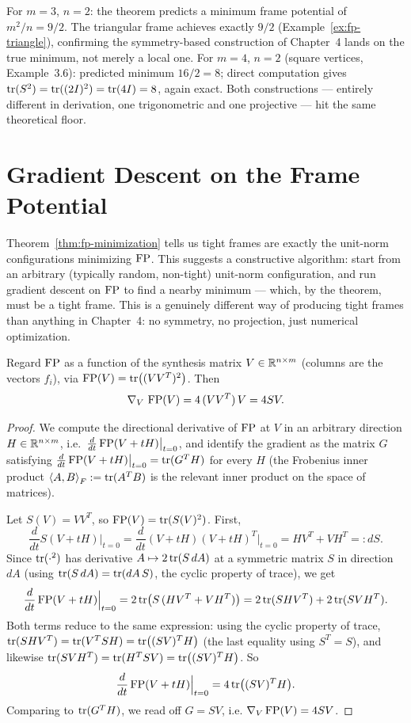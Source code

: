 \begin{examplebox}[title={Example 8.2: Verifying the minimum across constructions}]
\label{ex:fp-verify-constructions}
For $m=3$, $n=2$: the theorem predicts a minimum frame potential of
$m^2/n=9/2$. The triangular frame achieves exactly $9/2$
(Example~\ref{ex:fp-triangle}), confirming the symmetry-based
construction of Chapter~4 lands on the true minimum, not merely a local
one. For $m=4$, $n=2$ (square vertices, Example~3.6): predicted minimum
$16/2=8$; direct computation gives $\operatorname{tr}(S^2)=\operatorname{tr}((2I)^2)=\operatorname{tr}(4I)=8$,
again exact. Both constructions --- entirely different in derivation,
one trigonometric and one projective --- hit the same theoretical floor.
\end{examplebox}

\section{Gradient Descent on the Frame Potential}
\label{sec:gradient-descent}

Theorem~\ref{thm:fp-minimization} tells us tight frames are exactly the
unit-norm configurations minimizing $\operatorname{FP}$. This suggests a constructive
algorithm: start from an arbitrary (typically random, non-tight)
unit-norm configuration, and run gradient descent on $\operatorname{FP}$ to find a
nearby minimum --- which, by the theorem, must be a tight frame. This
is a genuinely different way of producing tight frames than anything in
Chapter~4: no symmetry, no projection, just numerical optimization.

\begin{proposition}
\label{prop:fp-gradient}
Regard $\operatorname{FP}$ as a function of the synthesis matrix $V\in\mathbb{R}^{n\times m}$
(columns are the vectors $f_i$), via $\operatorname{FP}(V)=\operatorname{tr}\bigl((VV^T)^2\bigr)$.
Then
\[
  \nabla_V\,\operatorname{FP}(V) = 4\,(VV^T)\,V = 4SV.
\]
\end{proposition}

\begin{proof}
We compute the directional derivative of $\operatorname{FP}$ at $V$ in an arbitrary
direction $H\in\mathbb{R}^{n\times m}$, i.e.\ $\frac{d}{dt}\operatorname{FP}(V+tH)\big|_{t=0}$,
and identify the gradient as the matrix $G$ satisfying
$\frac{d}{dt}\operatorname{FP}(V+tH)\big|_{t=0}=\operatorname{tr}(G^TH)$ for every $H$ (the
Frobenius inner product $\left\langle A, B \right\rangle_F:=\operatorname{tr}(A^TB)$ is the relevant
inner product on the space of matrices).

Let $S(V)=VV^T$, so $\operatorname{FP}(V)=\operatorname{tr}(S(V)^2)$. First,
\[
  \frac{d}{dt}S(V+tH)\Big|_{t=0}
  = \frac{d}{dt}(V+tH)(V+tH)^T\Big|_{t=0} = HV^T+VH^T =: dS.
\]
Since $\operatorname{tr}(\cdot^2)$ has derivative $A\mapsto2\operatorname{tr}(S\,dA)$ at a symmetric
matrix $S$ in direction $dA$ (using $\operatorname{tr}(S\,dA)=\operatorname{tr}(dA\,S)$, the cyclic
property of trace), we get
\[
  \frac{d}{dt}\operatorname{FP}(V+tH)\Big|_{t=0}
  = 2\operatorname{tr}\bigl(S\,(HV^T+VH^T)\bigr)
  = 2\operatorname{tr}(SHV^T) + 2\operatorname{tr}(SVH^T).
\]
Both terms reduce to the same expression: using the cyclic property of
trace, $\operatorname{tr}(SHV^T)=\operatorname{tr}(V^TSH)=\operatorname{tr}\bigl((SV)^TH\bigr)$ (the last equality
using $S^T=S$), and likewise $\operatorname{tr}(SVH^T)=\operatorname{tr}(H^TSV)=\operatorname{tr}\bigl((SV)^TH
\bigr)$. So
\[
  \frac{d}{dt}\operatorname{FP}(V+tH)\Big|_{t=0} = 4\operatorname{tr}\bigl((SV)^TH\bigr).
\]
Comparing to $\operatorname{tr}(G^TH)$, we read off $G=SV$, i.e.
$\nabla_V\operatorname{FP}(V)=4SV$.
\end{proof}

